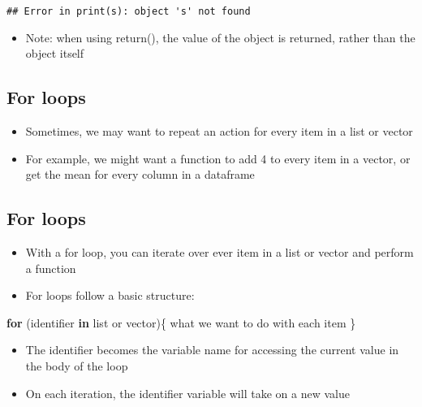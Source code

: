 \documentclass[]{article}
\newenvironment{Shaded}{\begin{snugshade}}{\end{snugshade}}
\newcommand{\ControlFlowTok}[1]{\textcolor[rgb]{0.13,0.29,0.53}{\textbf{#1}}}
\newcommand{\NormalTok}[1]{#1}
\providecommand{\tightlist}{%
  \setlength{\itemsep}{0pt}\setlength{\parskip}{0pt}}
\begin{document}
\begin{verbatim}
## Error in print(s): object 's' not found
\end{verbatim}

\begin{itemize}
\tightlist
\item
  Note: when using return(), the value of the object is returned, rather
  than the object itself
\end{itemize}

\subsection{For loops}\label{for-loops}

\begin{itemize}
\tightlist
\item
  Sometimes, we may want to repeat an action for every item in a list or
  vector
\item
  For example, we might want a function to add 4 to every item in a
  vector, or get the mean for every column in a dataframe
\end{itemize}

\subsection{For loops}\label{for-loops-1}

\begin{itemize}
\tightlist
\item
  With a for loop, you can iterate over ever item in a list or vector
  and perform a function
\item
  For loops follow a basic structure:
\end{itemize}

\begin{Shaded}
\begin{Highlighting}[]
\ControlFlowTok{for}\NormalTok{ (identifier }\ControlFlowTok{in}\NormalTok{ list or vector)\{}
\NormalTok{  what we want to do with each item}
\NormalTok{\}}
\end{Highlighting}
\end{Shaded}

\begin{itemize}
\tightlist
\item
  The identifier becomes the variable name for accessing the current
  value in the body of the loop
\item
  On each iteration, the identifier variable will take on a new value
\end{itemize}
\end{document}
